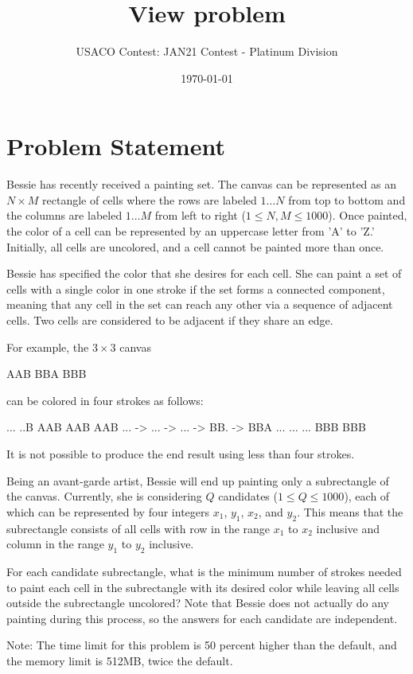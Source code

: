 \documentclass[12pt]{article}
\title{View problem}
\author{USACO Contest: JAN21 Contest - Platinum Division}
\date{\today}
\begin{document}
\maketitle

\section*{Problem Statement}

Bessie has recently received a painting set. The canvas can be represented as an
$N \times M$ rectangle of cells where the rows are labeled $1\ldots N$ from top
to bottom and the columns are labeled $1\ldots M$ from left to right
($1\le N,M\le 1000$). Once painted, the color of a cell can be represented by an
uppercase letter from 'A' to 'Z.'  Initially, all cells are uncolored, and a
cell cannot be painted more than once.

Bessie has specified the color that she desires for each cell. She can paint a
set of cells with a single color in one stroke if the set forms a connected
component, meaning that any cell in the set can reach any other via a sequence
of adjacent cells. Two cells are considered to be adjacent if they share an
edge.

For example, the $3\times 3$ canvas 


AAB
BBA
BBB

can be colored in four strokes as follows:


...    ..B    AAB    AAB    AAB
... -> ... -> ... -> BB. -> BBA
...    ...    ...    BBB    BBB

It is not possible to produce the end result using less than four strokes.

Being an avant-garde artist, Bessie will end up painting only a subrectangle of
the canvas. Currently, she is considering $Q$ candidates ($1\le Q\le 1000$),
each of which can be represented by four integers $x_1$, $y_1$, $x_2$, and
$y_2.$ This means that the subrectangle consists of all cells with row in the
range $x_1$ to $x_2$ inclusive and column in the range $y_1$ to $y_2$ inclusive.

For each candidate subrectangle, what is the minimum number of strokes needed to
paint each cell in the subrectangle with its desired color while leaving all 
cells outside the subrectangle uncolored? Note that Bessie does not actually do
any painting during this process, so the answers for each candidate are
independent. 

Note: The time limit for this problem is 50 percent higher than the default,
and the memory limit is 512MB, twice the default.
\end{document}
